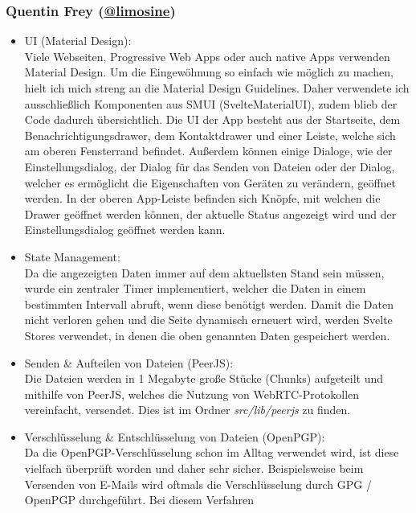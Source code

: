\documentclass[a4paper]{article}
\begin{document}
\subsubsection{Quentin Frey (\href{https://github.com/limosine}{@limosine})}
\begin{itemize}
  \item UI (Material Design):\\
        Viele Webseiten, Progressive Web Apps oder auch native Apps verwenden Material Design.
        Um die Eingewöhnung so einfach wie möglich zu machen, hielt ich mich streng an
        die Material Design Guidelines. Daher verwendete ich ausschließlich Komponenten aus
        SMUI (SvelteMaterialUI), zudem blieb der Code dadurch übersichtlich. Die UI der App
        besteht aus der Startseite, dem Benachrichtigungsdrawer, dem Kontaktdrawer und einer
        Leiste, welche sich am oberen Fensterrand befindet. Außerdem können einige Dialoge,
        wie der Einstellungsdialog, der Dialog für das Senden von Dateien oder der Dialog,
        welcher es ermöglicht die Eigenschaften von Geräten zu verändern, geöffnet werden.
        In der oberen App-Leiste befinden sich Knöpfe, mit welchen die Drawer geöffnet werden
        können, der aktuelle Status angezeigt wird und der Einstellungsdialog geöffnet werden kann.
  \item State Management:\\
        Da die angezeigten Daten immer auf dem aktuellsten Stand sein müssen, wurde
        ein zentraler Timer implementiert, welcher die Daten in einem bestimmten Intervall
        abruft, wenn diese benötigt werden. Damit die Daten nicht verloren gehen und die
        Seite dynamisch erneuert wird, werden Svelte Stores verwendet, in denen die oben
        genannten Daten gespeichert werden.
  \item Senden \& Aufteilen von Dateien (PeerJS):\\
        Die Dateien werden in 1 Megabyte große Stücke
        (Chunks) aufgeteilt und mithilfe von PeerJS, welches die Nutzung von WebRTC-Protokollen
        vereinfacht, versendet. Dies ist im Ordner \textit{src/lib/peerjs} zu finden.
  \item Verschlüsselung \& Entschlüsselung von Dateien (OpenPGP):\\
        Da die OpenPGP-Verschlüsselung schon im Alltag verwendet wird, ist diese
        vielfach überprüft worden und daher sehr sicher. Beispielsweise beim Versenden von E-Mails
        wird oftmals die Verschlüsselung durch GPG / OpenPGP durchgeführt. Bei diesem Verfahren

\end{itemize}
\end{document}
